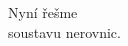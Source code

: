 \documentclass[preview]{standalone}
\begin{document}
\begin{center}
Nyní řešme \\ soustavu nerovnic.
\end{center}
\end{document}
